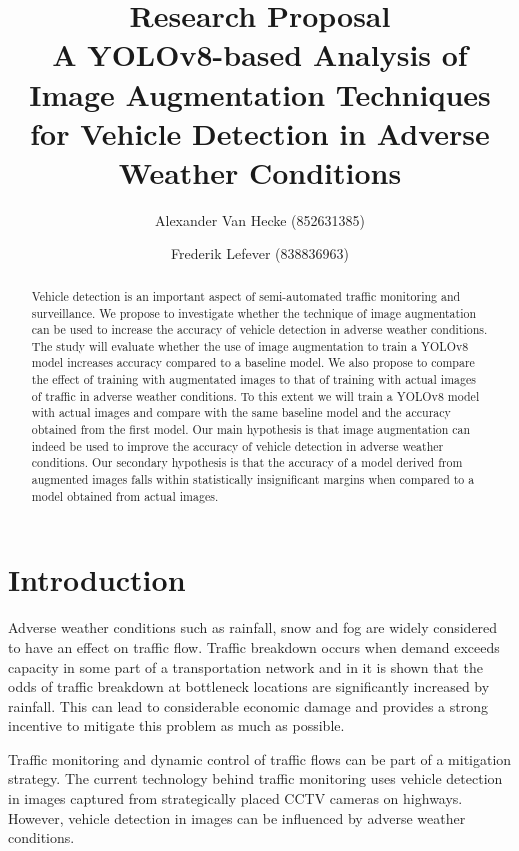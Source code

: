 \documentclass[]{article}
\title{Research Proposal \\
	A YOLOv8-based Analysis of Image Augmentation Techniques for Vehicle Detection in Adverse Weather Conditions}
\author{
		Alexander Van Hecke \small(852631385) \and 
		Frederik Lefever    \small(838836963)}
\begin{document}
\maketitle

\begin{abstract}
	Vehicle detection is an important aspect of semi-automated traffic monitoring and surveillance.  We propose to investigate whether the technique of image augmentation can be used to increase the accuracy of vehicle detection in adverse weather conditions.  The study will evaluate whether the use of image augmentation to train a YOLO\small{v8} model increases accuracy compared to a baseline model.  We also propose to compare the effect of training with augmentated images to that of training with actual images of traffic in adverse weather conditions. To this extent we will train a YOLO\small{v8} model with actual images and compare with the same baseline model and the accuracy obtained from the first model. Our main hypothesis is that image augmentation can indeed be used to improve the accuracy of vehicle detection in adverse weather conditions. Our secondary hypothesis is that the accuracy of a model derived from augmented images falls within statistically insignificant margins when compared to a model obtained from actual images.  
\end{abstract}

\section{Introduction}

	Adverse weather conditions such as rainfall, snow and fog are widely considered to have an effect on traffic flow. Traffic breakdown occurs when demand exceeds capacity in some part of a transportation network and in \cite{stralenInfluenceAdverseWeather2015} it is shown that the odds of traffic breakdown at bottleneck locations are significantly increased by rainfall.  This can lead to considerable economic damage and provides a strong incentive to mitigate this problem as much as possible.
	
	Traffic monitoring and dynamic control of traffic flows can be part of a mitigation strategy. The current technology behind traffic monitoring uses vehicle detection in images captured from strategically placed CCTV cameras on highways. However, vehicle detection in images can be influenced by adverse weather conditions.
	
\end{document}
